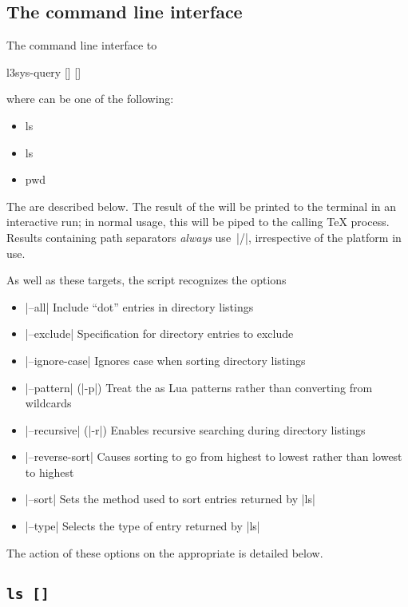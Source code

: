 \documentclass{l3doc}
\begin{document}
\begin{documentation}
\section{The command line interface}

The command line interface to 
\begin{center}
  \ttfamily
  l3sys-query  [] []
\end{center}
where \texttt{} can be one of the following:
\begin{itemize}[noitemsep]\ttfamily
  \item ls
  \item ls 
  \item pwd
\end{itemize}
The  are described below. The result of the  will be printed
to the terminal in an interactive run; in normal usage, this will be piped to
the calling \TeX{} process. Results containing path separators \emph{always}
use~|/|, irrespective of the platform in use.

As well as these targets, the script recognizes the options
\begin{itemize}
  \item |--all| Include \enquote{dot} entries in directory listings
  \item |--exclude| Specification for directory entries to exclude
  \item |--ignore-case| Ignores case when sorting directory listings
  \item |--pattern| (|-p|) Treat the  as Lua patterns rather
    than converting from wildcards
  \item |--recursive| (|-r|) Enables recursive searching during directory
    listings
  \item |--reverse-sort| Causes sorting to go from highest to lowest rather
    than lowest to highest
  \item |--sort| Sets the method used to sort entries returned by |ls|
  \item |--type| Selects the type of entry returned by |ls|
\end{itemize}
The action of these options on the appropriate  is detailed below.

\subsection{\texttt{ls []}}


\end{documentation}
\end{document}
